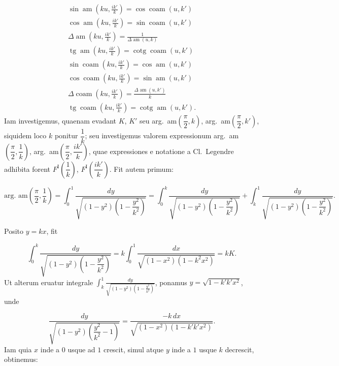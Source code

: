\documentclass{article}
\begin{document}
\[
\begin{gathered}
\sin\operatorname{am}\left(ku,\frac{ik'}{k}\right)=\cos\operatorname{coam}(u,k')\\[1.5ex]
\cos\operatorname{am}\left(ku,\frac{ik'}{k}\right)=\sin\operatorname{coam}(u,k')\\[1.5ex]
\Delta\operatorname{am}\left(ku,\frac{ik'}{k}\right)=\frac{1}{\Delta\operatorname{am}(u,k)}\\[1.5ex]
\operatorname{tg}\operatorname{am}\left(ku,\frac{ik'}{k}\right)=\operatorname{cotg}\operatorname{coam}(u,k')\\[1.5ex]
\sin\operatorname{coam}\left(ku,\frac{ik'}{k}\right)=\cos\operatorname{am}(u,k')\\[1.5ex]
\cos\operatorname{coam}\left(ku,\frac{ik'}{k}\right)=\sin\operatorname{am}(u,k')\\[1.5ex]
\Delta\operatorname{coam}\left(ku,\frac{ik'}{k}\right)=\frac{\Delta\operatorname{am}(u,k')}{k}\\[1.5ex]
\operatorname{tg}\operatorname{coam}\left(ku,\frac{ik'}{k}\right)=\operatorname{cotg}\operatorname{am}(u,k').
\end{gathered}
\]
Iam investigemus, quaenam evadant $K$, $K'$ seu arg.\ am$\left(\dfrac{\pi}{2},k\right)$, arg.\ am$\left(\dfrac{\pi}{2},k'\right)$, siquidem loco $k$ ponitur $\dfrac{1}{k}$; seu investigemus valorem expressionum arg.\ am$\left(\dfrac{\pi}{2},\dfrac{1}{k}\right)$, arg.\ am$\left(\dfrac{\pi}{2},\dfrac{ik'}{k}\right)$, quae expressiones e notatione a Cl.\ Legendre adhibita forent $F^{\mathrm{I}}\left(\dfrac{1}{k}\right)$, $F^{\mathrm{I}}\left(\dfrac{ik'}{k}\right)$. Fit autem primum:

\[
\text{arg.\ am}\left(\frac{\pi}{2},\frac{1}{k}\right)=\int_{0}^{1}\frac{dy}{\sqrt{(1-y^{2})\left(1-\dfrac{y^{2}}{k^{2}}\right)}}=\int_{0}^{k}\frac{dy}{\sqrt{(1-y^{2})\left(1-\dfrac{y^{2}}{k^{2}}\right)}}+\int_{k}^{1}\frac{dy}{\sqrt{(1-y^{2})\left(1-\dfrac{y^{2}}{k^{2}}\right)}}.
\]

Posito $y=kx$, fit

\[
\int_{0}^{k}\frac{dy}{\sqrt{(1-y^{2})\left(1-\dfrac{y^{2}}{k^{2}}\right)}}=k\int_{0}^{1}\frac{dx}{\sqrt{(1-x^{2})(1-k^{2}x^{2})}}=kK.
\]
Ut alterum eruatur integrale $\displaystyle\int_{k}^{1}\frac{dy}{\sqrt{(1-y^{2})\left(1-\frac{y^{2}}{k^{2}}\right)}}$, ponamus $y=\sqrt{1-k'k'x^{2}}$, unde

\[
\frac{dy}{\sqrt{(1-y^{2})\left(\dfrac{y^{2}}{k^{2}}-1\right)}}=\frac{-k\,dx}{\sqrt{(1-x^{2})(1-k'k'x^{2})}}.
\]
Iam quia $x$ inde a $0$ usque ad $1$ crescit, simul atque $y$ inde a $1$ usque $k$ decrescit, obtinemus:
\end{document}
